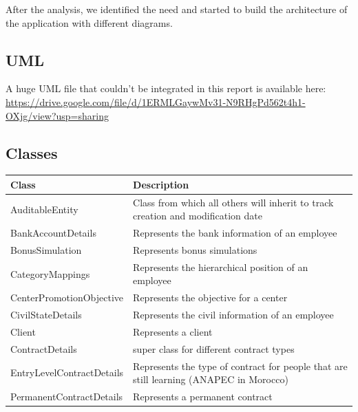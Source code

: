 \documentclass[12pt,a4paper,table,english]{article}
\begin{document}
	After the analysis, we identified the need and started to build the architecture of the application with different diagrams.
	
	\subsection{UML}	
	A huge UML file that couldn't be integrated in this report is available here: \url{https://drive.google.com/file/d/1ERMLGaywMv31-N9RHgPd562t4h1-OXjg/view?usp=sharing}\\
	
	\subsection{Classes}
	\begin{center}
		\renewcommand{\arraystretch}{1.5} %
		\begin{tabularx}{\textwidth}{| l | X |}
			\hline
			\textbf{Class} & \textbf{Description} \\\hline
			
			AuditableEntity & Class from which all others will inherit to track creation and modification date\\\hline
			
			BankAccountDetails & Represents the bank information of an employee\\\hline
			
			BonusSimulation & Represents bonus simulations \\\hline
			
			CategoryMappings & Represents the hierarchical position of an employee\\\hline
			
			CenterPromotionObjective & Represents the objective for a center\\\hline
			
			CivilStateDetails & Represents the civil information of an employee\\\hline
			
			Client & Represents a client\\\hline
		
			ContractDetails & super class for different contract types\\\hline
		
			EntryLevelContractDetails & Represents the type of contract for people that are still learning (ANAPEC in Morocco) \\\hline
			
			PermanentContractDetails & Represents a permanent contract \\\hline
			

\end{tabularx}
\end{center}
\end{document}
